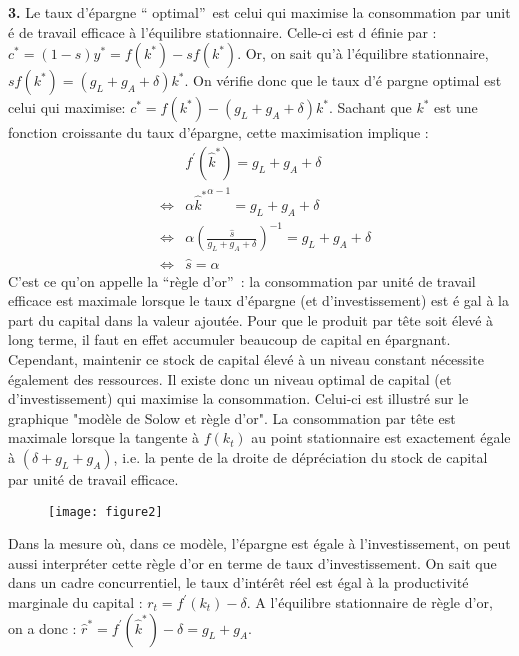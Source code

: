 \documentclass[11pt,a4paper]{article}
\begin{document}
\noindent \textbf{3.} Le taux d'\'{e}pargne \textquotedblleft
optimal\textquotedblright\ est celui qui maximise la consommation par unit%
\'{e} de travail efficace \`{a} l'\'{e}quilibre stationnaire. Celle-ci est d%
\'{e}finie par : $c^{\ast }=(1-s)y^{\ast }=f(k^{\ast })-sf(k^{\ast })$. Or,
on sait qu'\`{a} l'\'{e}quilibre stationnaire, $sf(k^{\ast
})=(g_{L}+g_{A}+\delta )k^{\ast }$. On v\'{e}rifie donc que le taux d'\'{e}%
pargne optimal est celui qui maximise: $c^{\ast }=f(k^{\ast
})-(g_{L}+g_{A}+\delta )k^{\ast }$. Sachant que $k^{\ast }$ est une fonction
croissante du taux d'\'{e}pargne, cette maximisation implique : 
\begin{eqnarray*}
&&f^{\prime }(\hat{k}^{\ast })=g_{L}+g_{A}+\delta \\
&\Leftrightarrow &\alpha \left. \hat{k}^{\ast }\right. ^{\alpha
-1}=g_{L}+g_{A}+\delta \\
&\Leftrightarrow &\alpha \left( \frac{\hat{s}}{g_{L}+g_{A}+\delta }\right)
^{-1}=g_{L}+g_{A}+\delta \\
&\Leftrightarrow &\hat{s}=\alpha
\end{eqnarray*}%
C'est ce qu'on appelle la \textquotedblleft r\`{e}gle
d'or\textquotedblright\ : la consommation par unit\'{e} de travail efficace
est maximale lorsque le taux d'\'{e}pargne (et d'investissement) est \'{e}%
gal \`{a} la part du capital dans la valeur ajout\'{e}e. Pour que le produit
par t\^{e}te soit \'{e}lev\'{e} \`{a} long terme, il faut en effet accumuler
beaucoup de capital en \'{e}pargnant. Cependant, maintenir ce stock de
capital \'{e}lev\'{e} \`{a} un niveau constant n\'{e}cessite \'{e}galement
des ressources. Il existe donc un niveau optimal de capital (et
d'investissement) qui maximise la consommation. Celui-ci est illustr\'{e}
sur le graphique "mod\`{e}le de Solow et r\`{e}gle d'or". La consommation
par t\^{e}te est maximale lorsque la tangente \`{a} $f(k_{t})$ au point
stationnaire est exactement \'{e}gale \`{a} $(\delta +g_{L}+g_{A})$, i.e. la
pente de la droite de d\'{e}pr\'{e}ciation du stock de capital par unit\'{e}
de travail efficace.

\begin{figure}[th]
\centering
\texttt{[image: figure2]}
\label{fig:1.4}
\end{figure}


Dans la mesure o\`u, dans ce mod\`ele, l'\'epargne est \'egale \`a
l'investissement, on peut aussi interpr\'eter cette r\`egle d'or en terme de
taux d'investissement. On sait que dans un cadre concurrentiel, le taux
d'int\'er\^et r\'eel est \'egal \`a la productivit\'e marginale du capital : 
$r_t=f^{\prime }(k_t)-\delta$. A l'\'equilibre stationnaire de r\`egle d'or,
on a donc : $\hat{r}^\ast=f^{\prime }(\hat{k}^\ast)-\delta=g_L+g_A$.
\end{document}
